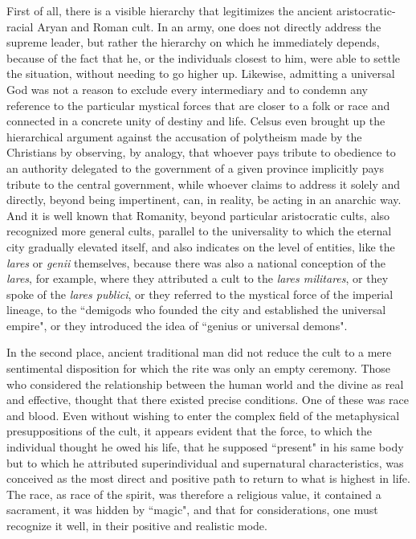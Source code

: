 First of all, there is a visible hierarchy that legitimizes the ancient aristocratic-racial Aryan and Roman cult. In an army, one does not directly address the supreme leader, but rather the hierarchy on which he immediately depends, because of the fact that he, or the individuals closest to him, were able to settle the situation, without needing to go higher up. Likewise, admitting a universal God was not a reason to exclude every intermediary and to condemn any reference to the particular mystical forces that are closer to a folk or race and connected in a concrete unity of destiny and life. Celsus even brought up the hierarchical argument against the accusation of polytheism made by the Christians by observing, by analogy, that whoever pays tribute to obedience to an authority delegated to the government of a given province implicitly pays tribute to the central government, while whoever claims to address it solely and directly, beyond being impertinent, can, in reality, be acting in an anarchic way. And it is well known that Romanity, beyond particular aristocratic cults, also recognized more general cults, parallel to the universality to which the eternal city gradually elevated itself, and also indicates on the level of entities, like the \emph{lares} or \emph{genii} themselves, because there was also a national conception of the \emph{lares}, for example, where they attributed a cult to the \emph{lares militares}, or they spoke of the \emph{lares publici}, or they referred to the mystical force of the imperial lineage, to the ``demigods who founded the city and established the universal empire", or they introduced the idea of ``genius or universal demons".

In the second place, ancient traditional man did not reduce the cult to a mere sentimental disposition for which the rite was only an empty ceremony. Those who considered the relationship between the human world and the divine as real and effective, thought that there existed precise conditions. One of these was race and blood. Even without wishing to enter the complex field of the metaphysical presuppositions of the cult, it appears evident that the force, to which the individual thought he owed his life, that he supposed ``present" in his same body but to which he attributed superindividual and supernatural characteristics, was conceived as the most direct and positive path to return to what is highest in life. The race, as race of the spirit, was therefore a religious value, it contained a sacrament, it was hidden by ``magic", and that for considerations, one must recognize it well, in their positive and realistic mode.

